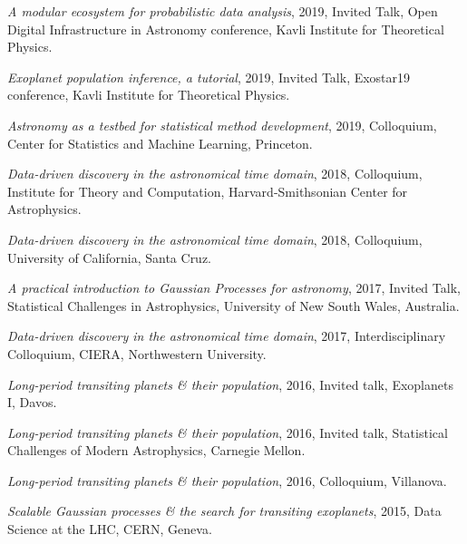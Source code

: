 \documentclass[12pt,letterpaper]{article}
\begin{document}
\begin{list}{}{\cvlist}

\item \emph{A modular ecosystem for probabilistic data analysis},
    2019, Invited Talk, Open Digital Infrastructure in Astronomy conference,
    Kavli Institute for Theoretical Physics.

\item \emph{Exoplanet population inference, a tutorial},
    2019, Invited Talk, Exostar19 conference,
    Kavli Institute for Theoretical Physics.

\item \emph{Astronomy as a testbed for statistical method development},
    2019, Colloquium, Center for Statistics and Machine Learning,
    Princeton.

\item \emph{Data-driven discovery in the astronomical time domain},
    2018, Colloquium, Institute for Theory and Computation,
    Harvard-Smithsonian Center for Astrophysics.

\item \emph{Data-driven discovery in the astronomical time domain},
    2018, Colloquium, University of California, Santa Cruz.

\item \emph{A practical introduction to Gaussian Processes for astronomy},
    2017, Invited Talk, Statistical Challenges in Astrophysics,
    University of New South Wales, Australia.

\item \emph{Data-driven discovery in the astronomical time domain},
    2017, Interdisciplinary Colloquium, CIERA, Northwestern University.

\item \emph{Long-period transiting planets \& their population},
    2016, Invited talk, Exoplanets I, Davos.

\item \emph{Long-period transiting planets \& their population},
    2016, Invited talk, Statistical Challenges of Modern Astrophysics,
    Carnegie Mellon.

\item \emph{Long-period transiting planets \& their population}, 2016,
    Colloquium, Villanova.

\item \emph{Scalable Gaussian processes \& the search for transiting
    exoplanets}, 2015, Data Science at the LHC, CERN, Geneva.


\end{list}
\end{document}
